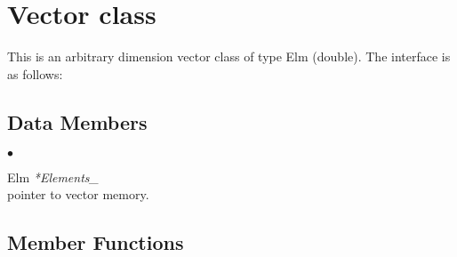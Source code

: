 \documentclass{article}
\newcommand{\var}[1]{\textit{#1}}
\newenvironment{LIST}{\begin{list}{$\bullet$}{%
      \setlength{\leftmargin}{2\leftmargin}%
      \setlength{\itemindent}{-1cm}}}%
  {\end{list}}
\begin{document}
\section{Vector class}

This is an arbitrary dimension vector class of type Elm (double).  The
interface is as follows:

\subsection{Data Members}

\begin{LIST}
   \item Elm \var{*Elements\_}\\
    pointer to vector memory.
\end{LIST}

\subsection{Member Functions}
\end{document}
